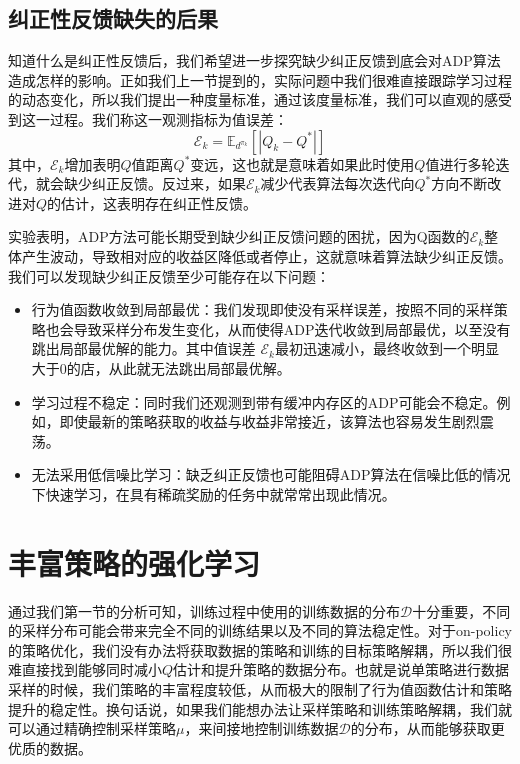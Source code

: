 \subsection{纠正性反馈缺失的后果}
知道什么是纠正性反馈后，我们希望进一步探究缺少纠正反馈到底会对ADP算法造成怎样的影响。正如我们上一节提到的，实际问题中我们很难直接跟踪学习过程的动态变化，所以我们提出一种度量标准，通过该度量标准，我们可以直观的感受到这一过程。我们称这一观测指标为值误差：
\begin{equation}
    \mathcal{E}_{k}=\mathbb{E}_{d^{\pi_{k}}}\left[\left|Q_{k}-Q^{*}\right|\right]
\end{equation}
其中，$\mathcal{E}_{k}$增加表明$Q$值距离$Q^*$变远，这也就是意味着如果此时使用$Q$值进行多轮迭代，就会缺少纠正反馈。反过来，如果$\mathcal{E}_{k}$减少代表算法每次迭代向$Q^*$方向不断改进对$Q$的估计，这表明存在纠正性反馈。

实验表明，ADP方法可能长期受到缺少纠正反馈问题的困扰，因为Q函数的$\mathcal{E}_{k}$整体产生波动，导致相对应的收益区降低或者停止，这就意味着算法缺少纠正反馈。我们可以发现缺少纠正反馈至少可能存在以下问题：
\begin{itemize}
    \item 行为值函数收敛到局部最优：我们发现即使没有采样误差，按照不同的采样策略也会导致采样分布发生变化，从而使得ADP迭代收敛到局部最优，以至没有跳出局部最优解的能力。其中值误差 $\mathcal{E}_{k}$最初迅速减小，最终收敛到一个明显大于0的店，从此就无法跳出局部最优解。
    \item 学习过程不稳定：同时我们还观测到带有缓冲内存区的ADP可能会不稳定。例如，即使最新的策略获取的收益与收益非常接近，该算法也容易发生剧烈震荡。
 \item 无法采用低信噪比学习：缺乏纠正反馈也可能阻碍ADP算法在信噪比低的情况下快速学习，在具有稀疏奖励的任务中就常常出现此情况。
\end{itemize}
 
\section{丰富策略的强化学习}
通过我们第一节的分析可知，训练过程中使用的训练数据的分布$\mathcal{D}$十分重要，不同的采样分布可能会带来完全不同的训练结果以及不同的算法稳定性。对于on-policy的策略优化，我们没有办法将获取数据的策略和训练的目标策略解耦，所以我们很难直接找到能够同时减小$Q$估计和提升策略的数据分布。也就是说单策略进行数据采样的时候，我们策略的丰富程度较低，从而极大的限制了行为值函数估计和策略提升的稳定性。换句话说，如果我们能想办法让采样策略和训练策略解耦，我们就可以通过精确控制采样策略$\mu$，来间接地控制训练数据$\mathcal{D}$的分布，从而能够获取更优质的数据。

